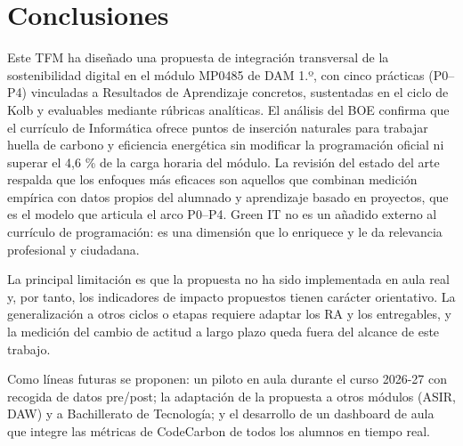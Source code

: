 \chapter{Conclusiones}
\label{cap:capitulo6}

Este TFM ha diseñado una propuesta de integración transversal de la sostenibilidad digital en el módulo MP0485 de DAM 1.º, con cinco prácticas (P0–P4) vinculadas a Resultados de Aprendizaje concretos, sustentadas en el ciclo de Kolb y evaluables mediante rúbricas analíticas. El análisis del BOE confirma que el currículo de Informática ofrece puntos de inserción naturales para trabajar huella de carbono y eficiencia energética sin modificar la programación oficial ni superar el 4,6 \% de la carga horaria del módulo. La revisión del estado del arte respalda que los enfoques más eficaces son aquellos que combinan medición empírica con datos propios del alumnado y aprendizaje basado en proyectos, que es el modelo que articula el arco P0–P4. Green IT no es un añadido externo al currículo de programación: es una dimensión que lo enriquece y le da relevancia profesional y ciudadana.


La principal limitación es que la propuesta no ha sido implementada en aula real y, por tanto, los indicadores de impacto propuestos tienen carácter orientativo. La generalización a otros ciclos o etapas requiere adaptar los RA y los entregables, y la medición del cambio de actitud a largo plazo queda fuera del alcance de este trabajo.


Como líneas futuras se proponen: un piloto en aula durante el curso 2026-27 con recogida de datos pre/post; la adaptación de la propuesta a otros módulos (ASIR, DAW) y a Bachillerato de Tecnología; y el desarrollo de un dashboard de aula que integre las métricas de CodeCarbon de todos los alumnos en tiempo real.
